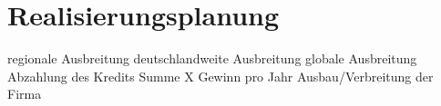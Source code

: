 \chapter{Realisierungsplanung}
\label{cha:8}
regionale Ausbreitung
deutschlandweite Ausbreitung
globale Ausbreitung
Abzahlung des Kredits
Summe X Gewinn pro Jahr
Ausbau/Verbreitung der Firma